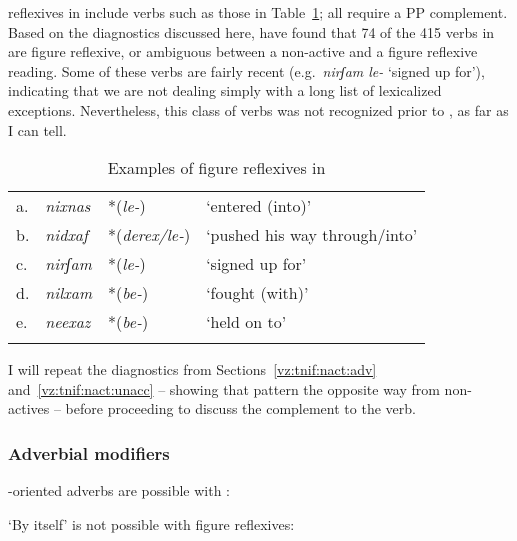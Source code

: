 \begin{exe}
\begin{xlist}
\begin{xlist}
\begin{exe}
\begin{xlist}
\begin{xlist}
\begin{exe}
\begin{xlist}
\begin{xlist}
\begin{exe}
\begin{exe}
\begin{xlist}
\begin{exe}
\begin{exe}
\begin{xlist}
 reflexives in {\tnif} include verbs such as those in Table~\ref{table:vz:figrefl}; all require a PP complement. Based on the diagnostics discussed here, \cite{ahdoutkastner19nels} have found that 74 of the 415 verbs in {\tnif} are figure reflexive, or ambiguous between a non-active and a figure reflexive reading. Some of these verbs are fairly recent (e.g.~\emph{nirʃam le-} `signed up for'), indicating that we are not dealing simply with a long list of lexicalized exceptions. Nevertheless, this class of verbs was not recognized prior to \cite{kastner16phd}, as far as I can tell.
\begin{table}
	\begin{tabularx}{.75\textwidth}{l>{\itshape}lll} 
 \lsptoprule
	a.& nixnas &  *(\emph{le-}) & `entered (into)'\\
	b.& nidxaf & *(\emph{derex/le-})  & `pushed his way through/into' \\
	c.& nirʃam & *(\emph{le-})  & `signed up for' \\
	d.& nilxam & *(\emph{be-}) & `fought (with)' \\
	e.& neexaz & *(\emph{be-}) & `held on to' \\
\lspbottomrule
     \end{tabularx}
	\caption{Examples of figure reflexives in {\tnif}}
\label{table:vz:figrefl}
\end{table}

I will repeat the diagnostics from Sections~\ref{vz:tnif:nact:adv} and~\ref{vz:tnif:nact:unacc} -- showing that  pattern the opposite way from non-actives -- before proceeding to discuss the complement to the verb.

		\subsubsection{Adverbial modifiers} \label{vz:tnif:figrefl:adv}
-oriented adverbs are possible with :
 \begin{exe}
	
 \z 

`By itself' is not possible with figure reflexives:
 \begin{exe}
 \z 


\end{exe}
\end{exe}
\end{xlist}
\end{exe}
\end{exe}
\end{xlist}
\end{exe}
\end{exe}
\end{xlist}
\end{xlist}
\end{exe}
\end{xlist}
\end{xlist}
\end{exe}
\end{xlist}
\end{xlist}
\end{exe}
